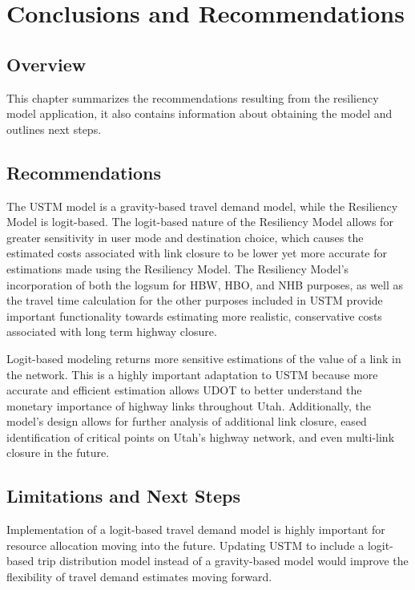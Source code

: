 \chapter{Conclusions and Recommendations}
\label{chp:chapter5}
\graphicspath{{figures/}{figures/chapter5/}}

\section{Overview}

This chapter summarizes the recommendations resulting from the resiliency
model application, it also contains information about obtaining the model and
outlines next steps.

\section{Recommendations}

The USTM model is a gravity-based travel demand model, while the Resiliency
Model is logit-based. The logit-based nature of the Resiliency Model allows
for greater sensitivity in user mode and destination choice, which causes
the estimated costs associated with link closure to be lower yet more
accurate for estimations made using the Resiliency Model. The Resiliency
Model's incorporation of both the logsum for HBW, HBO, and NHB purposes, as
well as the travel time calculation for the other purposes included in USTM
provide important functionality towards estimating more realistic, conservative costs
associated with long term highway closure.

Logit-based modeling returns more sensitive
estimations of the value of a link in the network. This is a highly
important adaptation to USTM because more accurate and efficient estimation allows
UDOT to better understand the monetary importance of highway links
throughout Utah. Additionally, the model’s design allows for further
analysis of additional link closure, eased identification of critical
points on Utah's highway network, and even multi-link closure in the
future.

\section{Limitations and Next Steps}

Implementation of a logit-based travel demand model is highly important for
resource allocation moving into the future. Updating USTM to include a
logit-based trip distribution model instead of a gravity-based model would
improve the flexibility of travel demand estimates moving forward.

